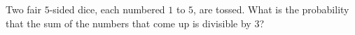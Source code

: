 Two fair $5$-sided dice, each numbered $1$ to $5$, are tossed. What is the probability that the sum of the numbers that come up is divisible by $3$?
